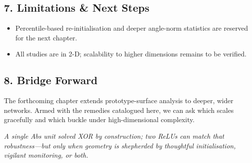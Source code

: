 \subsection*{7.  Limitations \& Next Steps}
\begin{itemize}
  \item Percentile-based re-initialisation and deeper angle-norm
        statistics are reserved for the next chapter.
  \item All studies are in 2-D; scalability to higher dimensions remains
        to be verified.
\end{itemize}

\subsection*{8.  Bridge Forward}
The forthcoming chapter extends prototype-surface analysis
to deeper, wider networks.  Armed with the remedies catalogued here, we
can ask which scales gracefully and which buckle under high-dimensional
complexity.

\medskip
\begin{center}
\emph{A single Abs unit solved XOR by construction; two ReLUs can match
that robustness—but only when geometry is shepherded by thoughtful
initialisation, vigilant monitoring, or both.}
\end{center}

